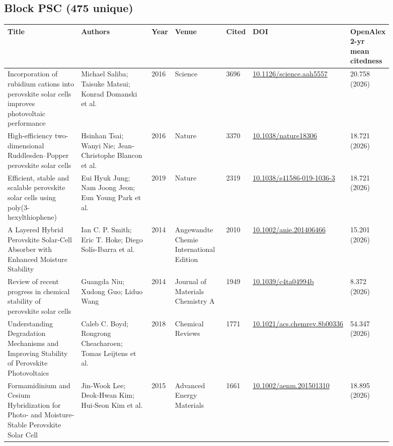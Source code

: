 \documentclass[10pt,a4paper]{article}
\begin{document}
\subsection*{Block PSC (475 unique)}
{\scriptsize\begin{longtable}{p{0.220\linewidth}p{0.220\linewidth}p{0.044\linewidth}p{0.148\linewidth}p{0.044\linewidth}p{0.107\linewidth}p{0.110\linewidth}}
\hline
\textbf{Title} & \textbf{Authors} & \textbf{Year} & \textbf{Venue} & \textbf{Cited} & \textbf{DOI} & \textbf{OpenAlex 2-yr mean citedness} \\ \hline
\endhead
Incorporation of rubidium cations into perovskite solar cells improves photovoltaic performance & Michael Saliba; Taisuke Matsui; Konrad Domanski et al. & 2016 & Science & 3696 & \href{https://doi.org/10.1126/science.aah5557}{10.1126/science.aah5557} & 20.758 (2026) \\
High-efficiency two-dimensional Ruddlesden–Popper perovskite solar cells & Hsinhan Tsai; Wanyi Nie; Jean‐Christophe Blancon et al. & 2016 & Nature & 3370 & \href{https://doi.org/10.1038/nature18306}{10.1038/nature18306} & 18.721 (2026) \\
Efficient, stable and scalable perovskite solar cells using poly(3-hexylthiophene) & Eui Hyuk Jung; Nam Joong Jeon; Eun Young Park et al. & 2019 & Nature & 2319 & \href{https://doi.org/10.1038/s41586-019-1036-3}{10.1038/s41586-019-1036-3} & 18.721 (2026) \\
A Layered Hybrid Perovskite Solar‐Cell Absorber with Enhanced Moisture Stability & Ian C. P. Smith; Eric T. Hoke; Diego Solís-Ibarra et al. & 2014 & Angewandte Chemie International Edition & 2010 & \href{https://doi.org/10.1002/anie.201406466}{10.1002/anie.201406466} & 15.201 (2026) \\
Review of recent progress in chemical stability of perovskite solar cells & Guangda Niu; Xudong Guo; Liduo Wang & 2014 & Journal of Materials Chemistry A & 1949 & \href{https://doi.org/10.1039/c4ta04994b}{10.1039/c4ta04994b} & 8.372 (2026) \\
Understanding Degradation Mechanisms and Improving Stability of Perovskite Photovoltaics & Caleb C. Boyd; Rongrong Cheacharoen; Tomas Leijtens et al. & 2018 & Chemical Reviews & 1771 & \href{https://doi.org/10.1021/acs.chemrev.8b00336}{10.1021/acs.chemrev.8b00336} & 54.347 (2026) \\
Formamidinium and Cesium Hybridization for Photo‐ and Moisture‐Stable Perovskite Solar Cell & Jin‐Wook Lee; Deok‐Hwan Kim; Hui‐Seon Kim et al. & 2015 & Advanced Energy Materials & 1661 & \href{https://doi.org/10.1002/aenm.201501310}{10.1002/aenm.201501310} & 18.895 (2026) \\

\end{longtable}}
\end{document}
